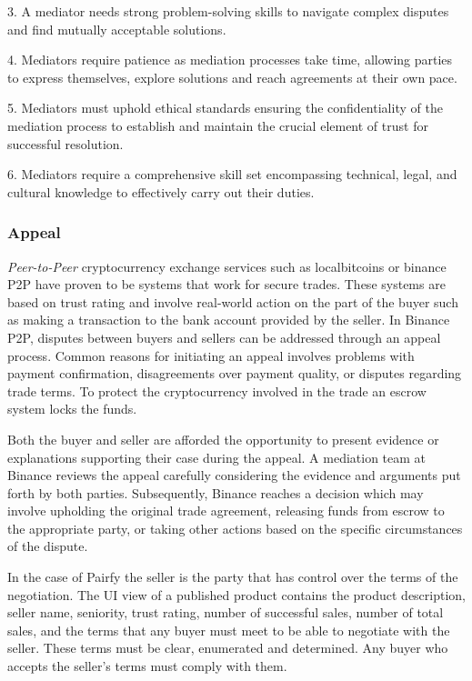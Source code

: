 \documentclass[12pt]{article}
\begin{document}
3. A mediator needs strong problem-solving skills to navigate complex disputes and find mutually acceptable solutions. 

4. Mediators require patience as mediation processes take time, allowing parties to express themselves, explore solutions and reach agreements at their own pace.

5. Mediators must uphold ethical standards ensuring the confidentiality of the mediation process to establish and maintain the crucial element of trust for successful resolution.

6. Mediators require a comprehensive skill set encompassing technical, legal, and cultural knowledge to effectively carry out their duties.

\subsubsection { Appeal } 

\emph{Peer-to-Peer} cryptocurrency exchange services such as localbitcoins or binance P2P have proven to be systems that work for secure trades. These systems are based on trust rating and involve real-world action on the part of the buyer such as making a transaction to the bank account provided by the seller. In Binance P2P, disputes between buyers and sellers can be addressed through an appeal process. Common reasons for initiating an appeal involves problems with payment confirmation, disagreements over payment quality, or disputes regarding trade terms. To protect the cryptocurrency involved in the trade an escrow system locks the funds.

Both the buyer and seller are afforded the opportunity to present evidence or explanations supporting their case during the appeal. A mediation team at Binance reviews the appeal carefully considering the evidence and arguments put forth by both parties. Subsequently, Binance reaches a decision which may involve upholding the original trade agreement, releasing funds from escrow to the appropriate party, or taking other actions based on the specific circumstances of the dispute.

In the case of Pairfy the seller is the party that has control over the terms of the negotiation. The UI view of a published product contains the product description, seller name, seniority, trust rating, number of successful sales, number of total sales, and the terms that any buyer must meet to be able to negotiate with the seller. These terms must be clear, enumerated and determined. Any buyer who accepts the seller's terms must comply with them.
\end{document}
